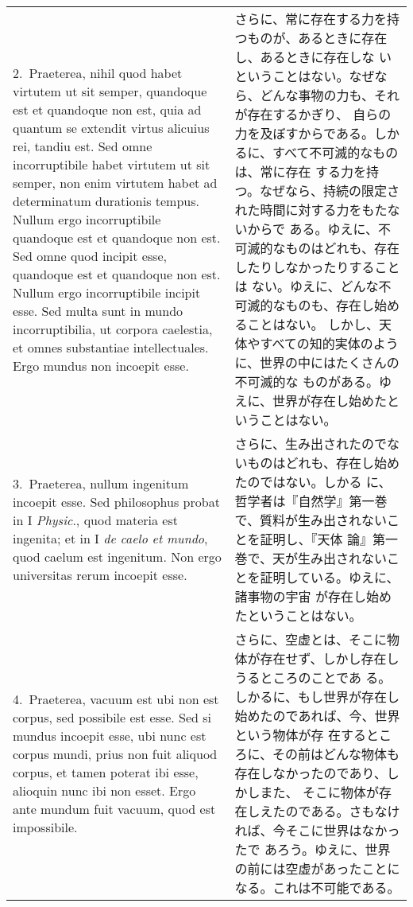 \documentclass[10pt]{jsarticle} %
\begin{document}
\begin{longtable}{p{21em}p{21em}}

2.~{\sc Praeterea}, nihil quod habet virtutem ut sit
 semper, quandoque est et quandoque non est, quia ad quantum se extendit
 virtus alicuius rei, tandiu est. Sed omne incorruptibile habet virtutem
 ut sit semper, non enim virtutem habet ad determinatum durationis
 tempus. Nullum ergo incorruptibile quandoque est et quandoque non
 est. Sed omne quod incipit esse, quandoque est et quandoque non
 est. Nullum ergo incorruptibile incipit esse. Sed multa sunt in mundo
 incorruptibilia, ut corpora caelestia, et omnes substantiae
 intellectuales. Ergo mundus non incoepit esse.

&
さらに、常に存在する力を持つものが、あるときに存在し、あるときに存在しな
 いということはない。なぜなら、どんな事物の力も、それが存在するかぎり、
 自らの力を及ぼすからである。しかるに、すべて不可滅的なものは、常に存在
 する力を持つ。なぜなら、持続の限定された時間に対する力をもたないからで
 ある。ゆえに、不可滅的なものはどれも、存在したりしなかったりすることは
 ない。ゆえに、どんな不可滅的なものも、存在し始めることはない。
しかし、天体やすべての知的実体のように、世界の中にはたくさんの不可滅的な
 ものがある。ゆえに、世界が存在し始めたということはない。

\\


3.~{\sc Praeterea}, nullum ingenitum incoepit esse. Sed philosophus probat in I
 {\itshape Physic}., quod materia est ingenita; et in I {\itshape de caelo et mundo}, quod
 caelum est ingenitum. Non ergo universitas rerum incoepit esse.

&

さらに、生み出されたのでないものはどれも、存在し始めたのではない。しかる
 に、哲学者は『自然学』第一巻で、質料が生み出されないことを証明し、『天体
 論』第一巻で、天が生み出されないことを証明している。ゆえに、諸事物の宇宙
 が存在し始めたということはない。


\\

4.~{\sc Praeterea}, vacuum est ubi non est corpus, sed possibile est esse. Sed
 si mundus incoepit esse, ubi nunc est corpus mundi, prius non fuit
 aliquod corpus, et tamen poterat ibi esse, alioquin nunc ibi non
 esset. Ergo ante mundum fuit vacuum, quod est impossibile.

&

さらに、空虚とは、そこに物体が存在せず、しかし存在しうるところのことであ
 る。しかるに、もし世界が存在し始めたのであれば、今、世界という物体が存
 在するところに、その前はどんな物体も存在しなかったのであり、しかしまた、
 そこに物体が存在しえたのである。さもなければ、今そこに世界はなかったで
 あろう。ゆえに、世界の前には空虚があったことになる。これは不可能である。



\end{longtable}
\end{document}
